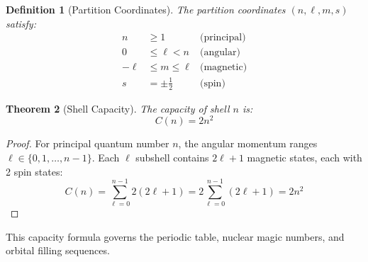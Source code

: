 \documentclass[twocolumn,amsmath,amssymb,aps,prl,superscriptaddress]{revtex4-2}
\newtheorem{theorem}{Theorem}[section]
\newtheorem{definition}[theorem]{Definition}
\begin{document}
\begin{definition}[Partition Coordinates]
\label{def:coords}
The partition coordinates $(n, \ell, m, s)$ satisfy:
\begin{align}
n &\geq 1 & \text{(principal)} \\
0 &\leq \ell < n & \text{(angular)} \\
-\ell &\leq m \leq \ell & \text{(magnetic)} \\
s &= \pm \tfrac{1}{2} & \text{(spin)}
\end{align}
\end{definition}

\begin{theorem}[Shell Capacity]
\label{thm:capacity}
The capacity of shell $n$ is:
\begin{equation}
C(n) = 2n^2
\end{equation}
\end{theorem}

\begin{proof}
For principal quantum number $n$, the angular momentum ranges $\ell \in \{0, 1, \ldots, n-1\}$. Each $\ell$ subshell contains $2\ell + 1$ magnetic states, each with 2 spin states:
\begin{equation}
C(n) = \sum_{\ell=0}^{n-1} 2(2\ell + 1) = 2 \sum_{\ell=0}^{n-1}(2\ell + 1) = 2n^2
\end{equation}
\end{proof}

This capacity formula governs the periodic table, nuclear magic numbers, and orbital filling sequences.
\end{document}
